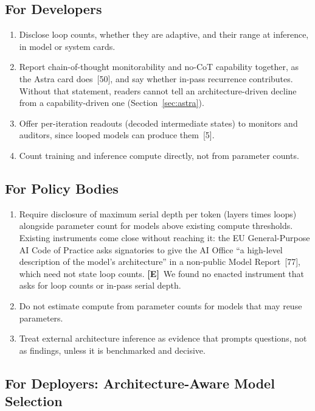 \documentclass[11pt,letterpaper]{article}
\newcommand{\mE}{\textcolor{deepindigo}{\textbf{[E]}}}
\begin{document}
\subsection{For Developers}
\label{sec:recdev}
\begin{enumerate}
  \item Disclose loop counts, whether they are adaptive, and their range at inference, in model or system cards.
  \item Report chain-of-thought monitorability and no-CoT capability together, as the Astra card does~[50], and say whether in-pass recurrence contributes. Without that statement, readers cannot tell an architecture-driven decline from a capability-driven one (Section~\ref{sec:astra}).
  \item Offer per-iteration readouts (decoded intermediate states) to monitors and auditors, since looped models can produce them~[5].
  \item Count training and inference compute directly, not from parameter counts.
\end{enumerate}

\subsection{For Policy Bodies}
\begin{enumerate}
  \item Require disclosure of maximum serial depth per token (layers times loops) alongside parameter count for models above existing compute thresholds. Existing instruments come close without reaching it: the EU General-Purpose AI Code of Practice asks signatories to give the AI Office ``a high-level description of the model's architecture'' in a non-public Model Report~[77], which need not state loop counts. \mE\ We found no enacted instrument that asks for loop counts or in-pass serial depth.
  \item Do not estimate compute from parameter counts for models that may reuse parameters.
  \item Treat external architecture inference as evidence that prompts questions, not as findings, unless it is benchmarked and decisive.
\end{enumerate}

\subsection{For Deployers: Architecture-Aware Model Selection}
\label{sec:recdeploy}
\end{document}

